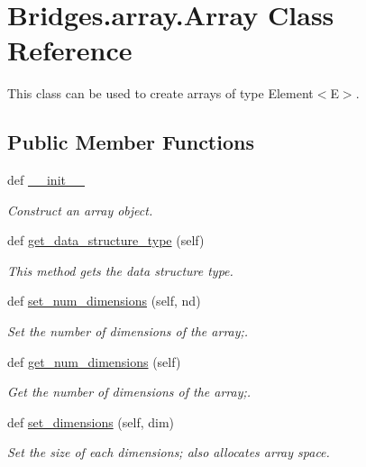 \hypertarget{class_bridges_1_1array_1_1_array}{}\section{Bridges.\+array.\+Array Class Reference}
\label{class_bridges_1_1array_1_1_array}


This class can be used to create arrays of type Element$<$\+E$>$.  


\subsection*{Public Member Functions}
\begin{DoxyCompactItemize}
\item 
def \hyperlink{class_bridges_1_1array_1_1_array_afbe480a593cda1a56d1fb0cadd35bdb8}{\+\_\+\+\_\+init\+\_\+\+\_\+}
\begin{DoxyCompactList}\small\item\em Construct an array object. \end{DoxyCompactList}\item 
def \hyperlink{class_bridges_1_1array_1_1_array_a8eba6b421a7d390c622ff473ae5b5cb1}{get\+\_\+data\+\_\+structure\+\_\+type} (self)
\begin{DoxyCompactList}\small\item\em This method gets the data structure type. \end{DoxyCompactList}\item 
def \hyperlink{class_bridges_1_1array_1_1_array_a0fdf82b7a0f6cb04b41db28a27a1a488}{set\+\_\+num\+\_\+dimensions} (self, nd)
\begin{DoxyCompactList}\small\item\em Set the number of dimensions of the array;. \end{DoxyCompactList}\item 
def \hyperlink{class_bridges_1_1array_1_1_array_abfebdd85d851c303279872803e67c0aa}{get\+\_\+num\+\_\+dimensions} (self)
\begin{DoxyCompactList}\small\item\em Get the number of dimensions of the array;. \end{DoxyCompactList}\item 
def \hyperlink{class_bridges_1_1array_1_1_array_aeb34acd2d485e00a520b30def036c04a}{set\+\_\+dimensions} (self, dim)
\begin{DoxyCompactList}\small\item\em Set the size of each dimensions; also allocates array space. \end{DoxyCompactList}\item 

\end{DoxyCompactItemize}
